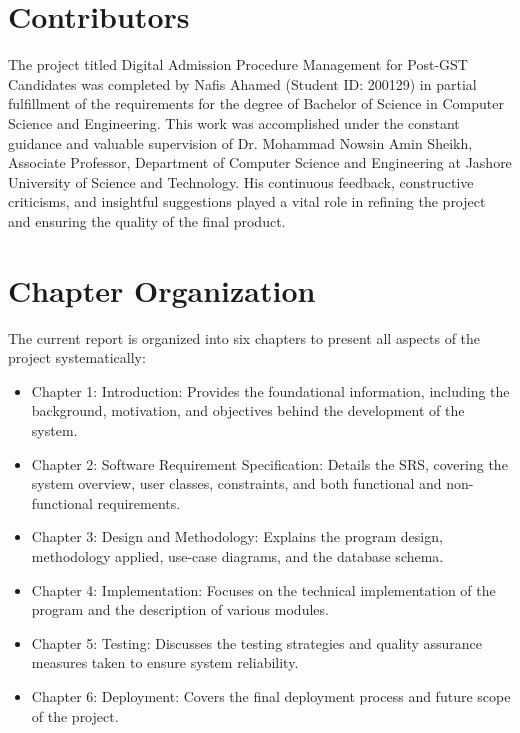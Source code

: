 \newpage


\section{Contributors} 
The project titled {Digital Admission Procedure Management for Post-GST Candidates} was completed by {Nafis Ahamed (Student ID: 200129)} in partial fulfillment of the requirements for the degree of Bachelor of Science in Computer Science and Engineering. This work was accomplished under the constant guidance and valuable supervision of {Dr. Mohammad Nowsin Amin Sheikh}, Associate Professor, Department of Computer Science and Engineering at Jashore University of Science and Technology. His continuous feedback, constructive criticisms, and insightful suggestions played a vital role in refining the project and ensuring the quality of the final product.

\section{Chapter Organization} 
The current report is organized into six chapters to present all aspects of the project systematically:

\begin{itemize}[leftmargin=1.5cm]
    \item {Chapter 1: Introduction}: Provides the foundational information, including the background, motivation, and objectives behind the development of the system.
    \item {Chapter 2: Software Requirement Specification}: Details the SRS, covering the system overview, user classes, constraints, and both functional and non-functional requirements.
    \item {Chapter 3: Design and Methodology}: Explains the program design, methodology applied, use-case diagrams, and the database schema.
    \item {Chapter 4: Implementation}: Focuses on the technical implementation of the program and the description of various modules.
    \item {Chapter 5: Testing}: Discusses the testing strategies and quality assurance measures taken to ensure system reliability.
    \item {Chapter 6: Deployment}: Covers the final deployment process and future scope of the project.
\end{itemize}